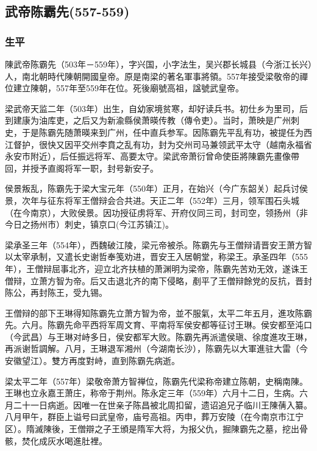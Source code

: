 
\subsection{武帝陈霸先\tiny(557-559)}

\subsubsection{生平}

陳武帝陈霸先（503年－559年），字兴国，小字法生，吴兴郡长城县（今浙江长兴）人，南北朝時代陳朝開國皇帝。原是南梁的著名軍事將領。557年接受梁敬帝的禪位建立陳朝，557年至559年在位。死後廟號高祖，諡號武皇帝。

梁武帝天监二年（503年）出生，自幼家境贫寒，却好读兵书。初仕乡为里司，后到建康为油库吏，之后又为新渝縣侯萧暎传教（傳令吏）。当时，萧映是广州刺史，于是陈霸先随萧暎来到广州，任中直兵参军。因陈霸先平乱有功，被提任为西江督护，很快又因平交州李賁之乱有功，封为交州司马兼领武平太守（越南永福省永安市附近），后任振远将军、高要太守。梁武帝萧衍曾命使臣將陳霸先畫像帶回，并授予直阁将军一职，封号新安子。

侯景叛乱，陈霸先于梁大宝元年（550年）正月，在始兴（今广东韶关）起兵讨侯景，次年与征东将军王僧辩会合共进。天正二年（552年）三月，领军围石头城（在今南京），大败侯景。因功授征虏将军、开府仪同三司，封司空，领扬州（非今日之扬州市）刺史，镇京口(今江苏镇江)。

梁承圣三年（554年），西魏破江陵，梁元帝被杀。陈霸先与王僧辩请晋安王萧方智以太宰承制，又遣长史谢哲奉笺劝进，晋安王入居朝堂，称梁王。承圣四年（555年），王僧辩屈事北齐，迎立北齐扶植的萧渊明为梁帝，陈霸先苦劝无效，遂诛王僧辩，立萧方智为帝。后又击退北齐的南下侵略，剷平了王僧辩餘党的反抗，晋封陈公，再封陈王，受九锡。

王僧辩的部下王琳得知陈霸先立萧方智为帝，並不服氣，太平二年五月，進攻陈霸先。六月。陈霸先命平西将军周文育、平南将军侯安都等征讨王琳。侯安都至沌口（今武昌）与王琳对峙多日，侯安都军大败。陈霸先再派遣侯瑱、徐度進攻王琳，再派谢哲調解。八月，王琳退军湘州（今湖南长沙），陈霸先以大軍進驻大雷（今安徽望江）。雙方再度對峙，直到陈霸先病逝。

梁太平二年（557年）梁敬帝萧方智禅位，陈霸先代梁称帝建立陈朝，史稱南陳。王琳也立永嘉王萧庄，称帝于荆州。陈永定三年（559年）六月十二日，生病。六月二十一日病逝。因唯一在世亲子陈昌被北周扣留，遗诏追兄子临川王陳蒨入纂。八月甲午，群臣上谥号曰武皇帝，庙号高祖。丙申，葬万安陵（在今南京市江宁区）。隋滅陳後，王僧辯之子王頒是隋军大将，为报父仇，掘陳霸先之墓，挖出骨骸，焚化成灰水喝進肚裡。

